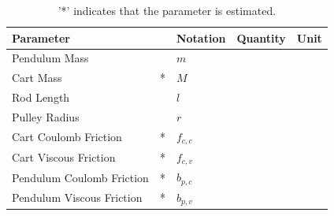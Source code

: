 \begin{table}[H]
\begin{tabular}{|lp{.4cm}|l|l|l|}
  \hline %
  \textbf{Parameter}        &   & \textbf{Notation} & \textbf{Quantity} & \textbf{Unit} \\
  \hline %
  Pendulum Mass             &   &   $m$             &                   &               \\
  \hline %
  Cart Mass                 & * &   $M$             &                   &               \\
  \hline %
  Rod Length                &   &   $l$             &                   &               \\
  \hline %
  Pulley Radius             &   &   $r$             &                   &               \\
  \hline %
  Cart Coulomb Friction     & * &   $f_{c,c}$       &                   &               \\
  \hline %
  Cart Viscous Friction     & * &   $f_{c,v}$       &                   &               \\
  \hline %
  Pendulum Coulomb Friction & * &   $b_{p,c}$       &                   &               \\
  \hline %
  Pendulum Viscous Friction & * &   $b_{p,v}$       &                   &               \\
  \hline %
\end{tabular}
\caption{'*' indicates that the parameter is estimated.\label{table:systemParameters}}
\end{table}